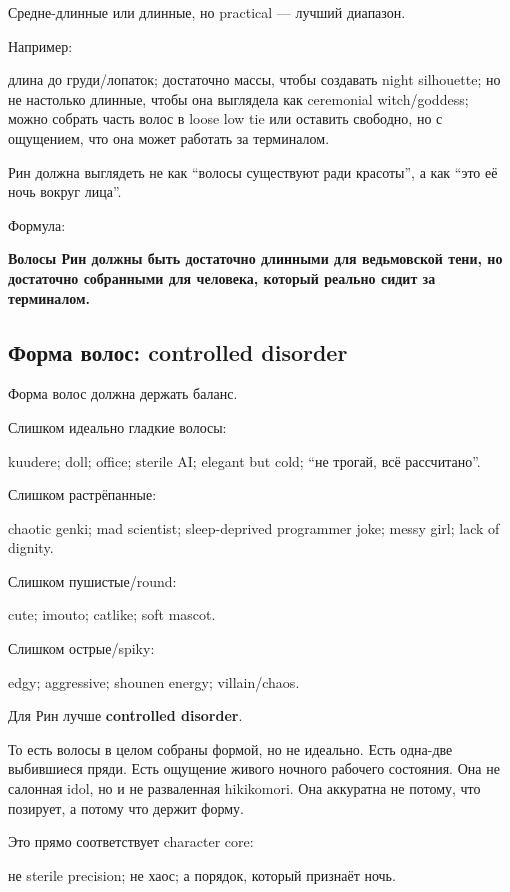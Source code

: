Средне-длинные или длинные, но practical --- лучший диапазон.

Например:

длина до груди/\hspace{0pt}лопаток; достаточно массы, чтобы создавать night
silhouette; но не настолько длинные, чтобы она выглядела как ceremonial
witch/\hspace{0pt}goddess; можно собрать часть волос в loose low tie или оставить
свободно, но с ощущением, что она может работать за терминалом.

Рин должна выглядеть не как ``волосы существуют ради красоты'', а как
``это её ночь вокруг лица''.

Формула:

\textbf{Волосы Рин должны быть достаточно длинными для ведьмовской тени,
но достаточно собранными для человека, который реально сидит за
терминалом.}

\subsection*{Форма волос: controlled disorder}

Форма волос должна держать баланс.

Слишком идеально гладкие волосы:

kuudere; doll; office; sterile AI; elegant but cold; ``не трогай, всё
рассчитано''.

Слишком растрёпанные:

chaotic genki; mad scientist; sleep-deprived programmer joke; messy
girl; lack of dignity.

Слишком пушистые/\hspace{0pt}round:

cute; imouto; catlike; soft mascot.

Слишком острые/\hspace{0pt}spiky:

edgy; aggressive; shounen energy; villain/\hspace{0pt}chaos.

Для Рин лучше \textbf{controlled disorder}.

То есть волосы в целом собраны формой, но не идеально. Есть одна-две
выбившиеся пряди. Есть ощущение живого ночного рабочего состояния. Она
не салонная idol, но и не разваленная hikikomori. Она аккуратна не
потому, что позирует, а потому что держит форму.

Это прямо соответствует character core:

не sterile precision; не хаос; а порядок, который признаёт ночь.

